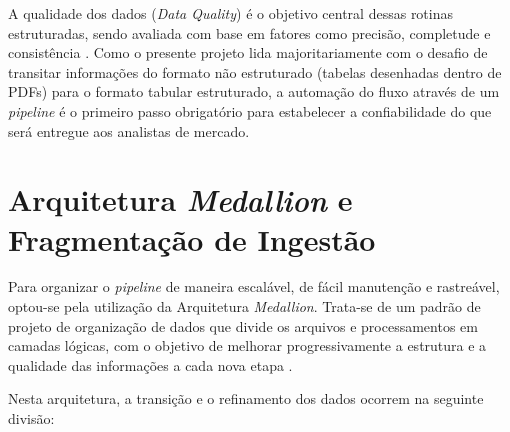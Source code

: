 A qualidade dos dados (\textit{Data Quality}) é o objetivo central dessas rotinas estruturadas, sendo avaliada com base em fatores como precisão, completude e consistência \cite{polisetty23}. Como o presente projeto lida majoritariamente com o desafio de transitar informações do formato não estruturado (tabelas desenhadas dentro de PDFs) para o formato tabular estruturado, a automação do fluxo através de um \textit{pipeline} é o primeiro passo obrigatório para estabelecer a confiabilidade do que será entregue aos analistas de mercado.

\section{Arquitetura \textit{Medallion} e Fragmentação de Ingestão}

Para organizar o \textit{pipeline} de maneira escalável, de fácil manutenção e rastreável, optou-se pela utilização da Arquitetura \textit{Medallion}. Trata-se de um padrão de projeto de organização de dados que divide os arquivos e processamentos em camadas lógicas, com o objetivo de melhorar progressivamente a estrutura e a qualidade das informações a cada nova etapa \cite{databricks_medallion, gujjala_medallion}.

Nesta arquitetura, a transição e o refinamento dos dados ocorrem na seguinte divisão:

